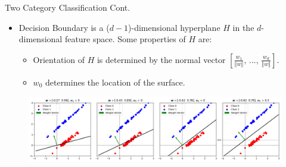 \documentclass[serif, aspectratio=169]{beamer}
\begin{document}
\begin{frame}{Two Category Classification Cont.}
    \begin{itemize}\itemsep1.5em
        \item Decision Boundary is a (\(d - 1\))-dimensional hyperplane \(H\) in the \(d\)-dimensional feature space. Some properties of \(H\) are:
        \medskip
        \begin{itemize}\itemsep0.7em
            \item Orientation of \(H\) is determined by the normal vector \([\frac{w_1}{\Vert w \Vert} , \, ..., \, \frac{w_d}{\Vert w \Vert}]\).
            \item \(w_0\) determines the location of the surface.
        \end{itemize}
    \end{itemize}
    \begin{figure}
        \centering
        \includegraphics[width=\linewidth]{pic/Figure_25.png}
    \end{figure}
\end{frame}
\end{document}
